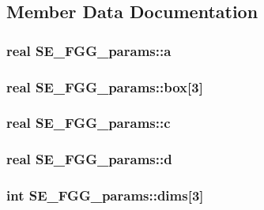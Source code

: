 \subsection{\-Member \-Data \-Documentation}
\hypertarget{structSE__FGG__params_a381fb28cfc98af969bc757467aa8135f}{
\subsubsection[{a}]{\setlength{\rightskip}{0pt plus 5cm}real {\bf \-S\-E\-\_\-\-F\-G\-G\-\_\-params\-::a}}}\label{structSE__FGG__params_a381fb28cfc98af969bc757467aa8135f}
\hypertarget{structSE__FGG__params_a412822931449f2a5065b386e34e233c0}{
\subsubsection[{box}]{\setlength{\rightskip}{0pt plus 5cm}real {\bf \-S\-E\-\_\-\-F\-G\-G\-\_\-params\-::box}\mbox{[}3\mbox{]}}}\label{structSE__FGG__params_a412822931449f2a5065b386e34e233c0}
\hypertarget{structSE__FGG__params_a6a4c656e361cd9d9dab1d29aff81fae0}{
\subsubsection[{c}]{\setlength{\rightskip}{0pt plus 5cm}real {\bf \-S\-E\-\_\-\-F\-G\-G\-\_\-params\-::c}}}\label{structSE__FGG__params_a6a4c656e361cd9d9dab1d29aff81fae0}
\hypertarget{structSE__FGG__params_ab4b64cbacc8748d353edae97b39db58d}{
\subsubsection[{d}]{\setlength{\rightskip}{0pt plus 5cm}real {\bf \-S\-E\-\_\-\-F\-G\-G\-\_\-params\-::d}}}\label{structSE__FGG__params_ab4b64cbacc8748d353edae97b39db58d}
\hypertarget{structSE__FGG__params_a394b6a5377b8f7afc1329728b43723d9}{
\subsubsection[{dims}]{\setlength{\rightskip}{0pt plus 5cm}int {\bf \-S\-E\-\_\-\-F\-G\-G\-\_\-params\-::dims}\mbox{[}3\mbox{]}}}\label{structSE__FGG__params_a394b6a5377b8f7afc1329728b43723d9}
